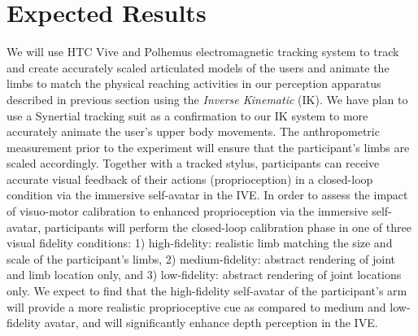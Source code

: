 \section{Expected Results}
We will use HTC Vive and Polhemus electromagnetic tracking system to track and create accurately scaled articulated models of the users and animate the limbs to match the physical reaching activities in our perception apparatus described in previous section using the \textit{Inverse Kinematic} (IK). We have plan to use a Synertial tracking suit as a confirmation to our IK system to more accurately animate the user's upper body movements. The anthropometric measurement prior to the experiment will ensure that the participant’s limbs are scaled accordingly. Together with a tracked stylus, participants can receive accurate visual feedback of their actions (proprioception) in a closed-loop condition via the immersive self-avatar in the IVE. In order to assess the impact of visuo-motor calibration to enhanced proprioception via the immersive self-avatar, participants will perform the closed-loop calibration phase in one of three visual fidelity conditions: 1) high-fidelity: realistic limb matching the size and scale of the participant’s limbs, 2) medium-fidelity: abstract rendering of joint and limb location only, and 3) low-fidelity: abstract rendering of joint locations only. We expect to find that the high-fidelity self-avatar of the participant’s arm will provide a more realistic proprioceptive cue as compared to medium and low-fidelity avatar, and will significantly enhance depth perception in the IVE. 

